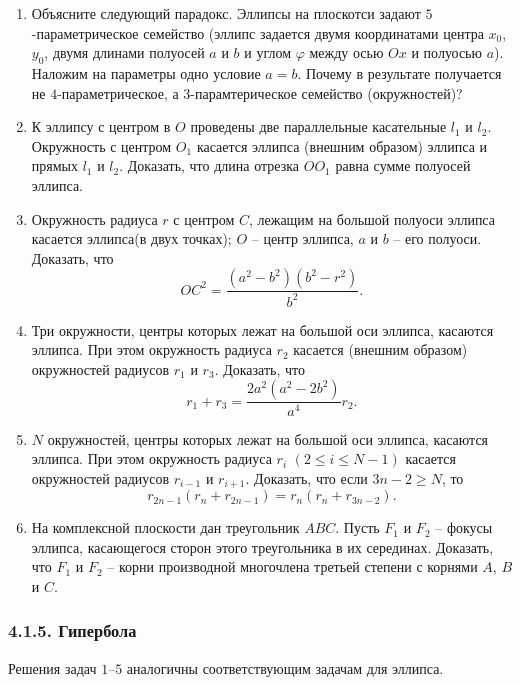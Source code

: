 \begin{enumerate}
	\item Объясните следующий парадокс. Эллипсы на плоскотси задают $5$-параметрическое семейство (эллипс задается двумя координатами центра $x_0$, $y_0$, двумя длинами полуосей $a$ и $b$ и углом $\varphi$ между осью $Ox$ и полуосью $a$). Наложим на параметры одно условие $a = b$. Почему в результате получается не $4$-параметрическое, а $3$-парамтерическое семейство (окружностей)?

	\item К эллипсу  с центром в $O$ проведены две параллельные касательные $l_1$ и $l_2$. Окружность с центром $O_1$ касается эллипса (внешним образом) эллипса и прямых $l_1$ и $l_2$. Доказать, что длина отрезка $OO_1$ равна сумме полуосей эллипса.
	\item Окружность радиуса $r$ с центром $C$, лежащим на большой полуоси эллипса касается эллипса(в двух точках); $O$ -- центр эллипса, $a$ и $b$ -- его полуоси. Доказать, что
	\[
		OC^2 = \frac{(a^2 - b^2)(b^2 - r^2)}{b^2}.
	\]
	\item Три окружности, центры которых лежат на большой оси эллипса, касаются эллипса. При этом окружность радиуса $r_2$ касается (внешним образом) окружностей радиусов $r_1$ и $r_3$. Доказать, что
	\[
		r_1 + r_3 = \frac{2a^2(a^2 - 2b^2)}{a^4} r_2.
	\]

	\item $N$ окружностей, центры которых лежат на большой оси эллипса, касаются эллипса. При этом окружность радиуса $r_i$ $(2 \leq i \leq N - 1)$ касается окружностей радиусов $r_{i-1}$ и $r_{i+1}$. Доказать, что если $3n - 2 \ge N$, то
	\[
		r_{2n-1}(r_n + r_{2n-1}) = r_n(r_n + r_{3n-2}).
	\]

	\item На комплексной плоскости дан треугольник $ABC$. Пусть $F_1$ и $F_2$ -- фокусы эллипса, касающегося сторон этого треугольника в их серединах. Доказать, что $F_1$ и $F_2$ -- корни производной многочлена третьей степени с корнями $A$, $B$ и $C$.
\end{enumerate}

\subsubsection*{4.1.5. Гипербола}

Решения задач $1$–$5$ аналогичны соответствующим задачам для эллипса.


